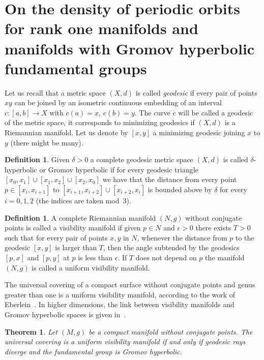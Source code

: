 \documentclass[10pt]{amsart}
\newtheorem{theo}[cdrthm]{Theorem}
\theoremstyle{definition}
\newtheorem{defi}[cdrthm]{Definition}
\begin{document}
\section{On the density of periodic orbits for rank one manifolds and manifolds with Gromov hyperbolic fundamental groups}\label{SECgromov}

Let us recall that a metric space $(X,d)$ is called \emph{geodesic} if every pair of points $xy$ can be joined by an isometric continuous embedding of an interval $c: [a,b] \longrightarrow X$ with $c(a)=x$, $c(b)=y$. The curve $c$ will be called a geodesic of the metric space, it corresponds to minimizing geodesics if $(X,d)$ is a Riemannian manifold. Let us denote by $[x,y]$ a minimizing geodesic joining $x$ to $y$ (there might be many).

\begin{defi}\label{Gromov-hyperbolic}
Given $\delta >0$ a complete geodesic metric space $(X,d)$ is called $\delta$-hyperbolic or Gromov hyperbolic if for every geodesic triangle $[x_{0},x_{1}] \cup [x_{1},x_{2}] \cup [x_{2},x_{0}]$ we have that the distance from every point $p \in [x_{i},x_{i+1}]$ to $[x_{i+1},x_{i+2}]\cup [x_{i+2},x_{i}]$ is bounded above by $\delta$ for every $i = 0,1,2$ (the indices are taken mod~3).
\end{defi}

\begin{defi}\label{visibility}
A complete Riemannian manifold $(N,g)$ without conjugate points is called a visibility manifold if given $p \in N$ and $\epsilon >0$ there exists $T>0$ such that for every pair of points $x, y $ in $N$, whenever the distance from $p$ to the geodesic $[x,y]$ is larger than $T$, then the angle subtended by the geodesics $[p,x]$ and $[p,y]$ at $p$ is less than $\epsilon$. If $T$ does not depend on $p$ the manifold $(N,g)$ is called a uniform visibility manifold.
\end{defi}

The universal covering of a compact surface without conjugate points and genus greater than one is a uniform visibility manifold, according to the work of Eberlein~\cite{kn:Eberlein}. In higher dimensions, the link between visibility manifolds and Gromov hyperbolic spaces is given in~\cite{kn:Ruggiero-Ensaios,kn:Ruggiero-SBM}.

\begin{theo}\label{visibility-gromov}
Let $(M,g)$ be a compact manifold without conjugate points. The universal covering is a uniform visibility manifold if and only if geodesic rays diverge and the fundamental group is Gromov hyperbolic.
\end{theo}
\end{document}
